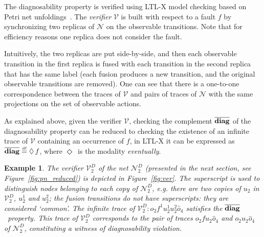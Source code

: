 \documentclass[a4paper]{article}
\newcommand{\eventually} {\Diamond\,}
\newcommand{\veri}  {\ensuremath{\mathcal{V}}\xspace}
\newcommand{\ndiagltl}   {\ensuremath{\overline{\bf diag}\xspace}}
\newcommand{\DEF}            {\stackrel{\mbox{{\tiny\rm df}}}{=}}
\newcommand\netn{{\mathcal{N}}}
\newtheorem{exmp}{Example}
\begin{document}
The diagnosability property is verified using LTL-X model checking based on Petri net unfoldings~\cite{Madalinski2010}.  The \emph{verifier} \veri is built with respect to a fault $f$ by synchronizing two replicas of $\netn$ on the observable transitions. Note that for efficiency reasons one replica does not consider the fault. 

Intuitively, the two replicas are put side-by-side, and then each observable transition in the first replica is fused with each transition in the second replica that has the same label (each fusion produces a new transition, and the original observable transitions are removed). One can see that there is a one-to-one correspondence between the traces of \veri and pairs of traces of $\netn$ with the same projections on the set of observable actions.

As explained above, given the verifier \veri, checking the complement $\ndiagltl$ of the diagnosability property can be reduced to checking the existence of an infinite trace of \veri containing an occurrence of $f$, in LTL-X it can be expressed as $\ndiagltl\DEF\eventually f$, where $\eventually$ is the modality \emph{eventually}.

\begin{exmp} 
  The verifier $\veri^D_2$ of the net $\netn^D_2$ (presented in the next section, see Figure~\ref{fig:pn_reduced}) is depicted in Figure~\ref{fig:ver}. The superscript is used to distinguish nodes belonging 
to each copy of ${\netn^D_2}$, e.g. there are two copies of $u_2$ in $\veri^D_2$, $u_2^1$ and $u_2^2$; the fusion transitions do not have superscripts: they are considered `common'. The infinite trace of $\veri^D_2 : o_2 f^1 u_2^1 u_2^2 \widehat{o}_4$ satisfies  the \ndiagltl\ property. This trace of $\veri^D_2$ corresponds to the pair of traces $o_2 f u_2 \widehat{o}_4$ and  $o_2 u_2 \widehat{o}_4$ of $\netn^D_2$, constituting a witness of diagnosability violation.
  \label{ex:veri}
\end{exmp}
\end{document}
